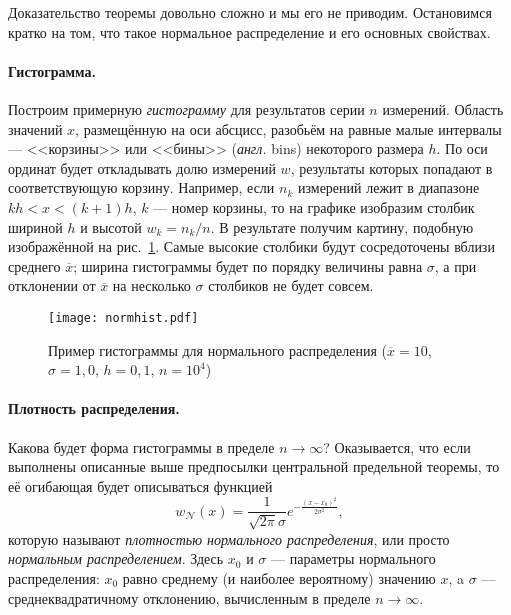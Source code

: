 \documentclass[10pt]{article}
\begin{document}
Доказательство теоремы довольно сложно и мы его не приводим. Остановимся
кратко на том, что такое нормальное распределение и его основных свойствах.

\paragraph{Гистограмма.}

Построим примерную \emph{гистограмму} для результатов серии $n$ измерений.
Область значений $x$, размещённую на оси абсцисс, разобьём на равные
малые интервалы --- <<корзины>>
или <<бины>> (\emph{англ.} bins) некоторого
размера $h$. По оси ординат будет откладывать долю измерений $w$,
результаты которых попадают в соответствующую корзину. Например, если
$n_{k}$ измерений лежит в диапазоне $kh<x<(k+1)h$, $k$ ---
номер корзины, то на графике изобразим столбик шириной $h$ и высотой
$w_{k}=n_{k}/n$. В результате получим картину, подобную изображённой
на рис.~\ref{fig:normhist}. Самые высокие столбики будут сосредоточены
вблизи среднего $\overline{x}$; ширина гистограммы будет по порядку
величины равна $\sigma$, а при отклонении от $\overline{x}$ на несколько
$\sigma$ столбиков не будет совсем.

\begin{figure}
\begin{centering}
\texttt{[image: normhist.pdf]}
\par\end{centering}
\caption{\label{fig:normhist}Пример гистограммы для нормального распределения
($\overline{x}=10$, $\sigma=1{,}0$, $h=0{,}1$, $n=10^{4}$)}
\end{figure}


\paragraph{Плотность распределения.}

Какова будет форма гистограммы в пределе $n\to\infty$? Оказывается,
что если выполнены описанные выше предпосылки центральной предельной
теоремы, то её огибающая будет описываться функцией
\begin{equation}
\boxed{w_{\mathcal{N}}\!\left(x\right)=\frac{1}{\sqrt{2\pi}\sigma}e^{-\tfrac{(x-x_{0})^{2}}{2\sigma^{2}}}},\label{eq:normal}
\end{equation}
которую называют \emph{плотностью нормального распределения}, или
просто \emph{нормальным распределением}. Здесь $x_{0}$ и $\sigma$
--- параметры нормального распределения: $x_{0}$ равно
среднему (и наиболее вероятному) значению $x$, a $\sigma$ ---
среднеквадратичному отклонению, вычисленным в пределе $n\to\infty$. 
\end{document}
